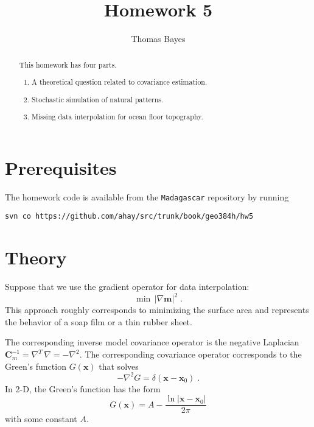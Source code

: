 \author{Thomas Bayes}
\title{Homework 5}

\begin{abstract}
  This homework has four parts. 
  \begin{enumerate}
    \item A theoretical question related to covariance estimation.
    \item Stochastic simulation of natural patterns.
    \item Missing data interpolation for ocean floor topography.
  \end{enumerate}
\end{abstract}

\section{Prerequisites}

The homework code is available from the \texttt{Madagascar} repository
by running
\begin{verbatim}
svn co https://github.com/ahay/src/trunk/book/geo384h/hw5
\end{verbatim}

\section{Theory}

Suppose that we use the gradient operator for data interpolation:
\begin{equation}
\label{eq:grad}
\min\,\left|\nabla \mathbf{m}\right|^2\;.
\end{equation}  
This approach roughly corresponds to minimizing the surface area and
represents the behavior of a soap film or a thin rubber sheet.

The corresponding inverse model covariance operator is the negative Laplacian
$\mathbf{C}_m^{-1}=\nabla^T\,\nabla=-\nabla^2$. The corresponding
covariance operator corresponds to the Green's function $G(\mathbf{x})$ that solves
\begin{equation}
\label{eq:green}
-\nabla^2 G = \delta(\mathbf{x}-\mathbf{x}_0)\;.
\end{equation}
In 2-D, the Green's function has the form 
\begin{equation}
\label{eq:g2d}
G(\mathbf{x}) = \displaystyle A - \frac{\ln |\mathbf{x}-\mathbf{x}_0|}{2\pi}
\end{equation}
with some constant $A$.

